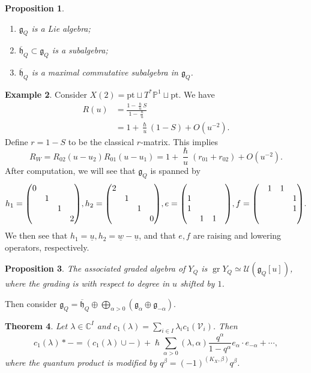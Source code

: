 \documentclass[leqno, openany]{memoir}
\newtheorem{thm}{Theorem}[section]
\newtheorem{prop}[thm]{Proposition}
\theoremstyle{definition}
\newtheorem{exm}[thm]{Example}
\theoremstyle{remark}
\theoremstyle{plain}
\theoremstyle{definition}
\theoremstyle{remark}
\newcommand{\C}{\mathbb{C}}
\renewcommand{\P}{\mathbb{P}}
\newcommand{\mc}[1]{\mathcal{#1}}
\newcommand{\mf}[1]{\mathfrak{#1}}
\newcommand{\mr}[1]{\mathrm{#1}}
\newcommand{\on}[1]{\operatorname{#1}}
\newcommand{\ol}[1]{\overline{#1}}
\newcommand{\ul}[1]{\underline{#1}}
\begin{document}
\begin{prop}\leavevmode
    \begin{enumerate}
        \item $\mf{g}_Q$ is a Lie algebra;
        \item $\ol{\mf{h}}_Q \subset \mf{g}_Q$ is a subalgebra;
        \item $\ol{\mf{h}}_Q$ is a maximal commutative subalgebra in $\mf{g}_Q$.
    \end{enumerate}
\end{prop}

\begin{exm}
    Consider $X(2) = \mr{pt} \sqcup T^* \P^1 \sqcup \mr{pt}$. We have
    \begin{align*}
        R(u) &= \frac{1-\frac{\hslash}{u}S}{1-\frac{\hslash}{u}} \\
        &= 1 + \frac{\hslash}{u}(1-S) + O(u^{-2}).
    \end{align*}
    Define $r = 1-S$ to be the classical $r$-matrix. This implies 
    \[ R_W = R_{02}(u-u_2) R_{01}(u-u_1) = 1 + \frac{\hslash}{u}(r_{01} + r_{02}) + O(u^{-2}). \]
    After computation, we will see that $\mf{g}_Q$ is spanned by
    \[ h_1 = \mqty(\dmat{0,1,1,2}), h_2 = \mqty(\dmat{2,1,1,0}), e = \mqty( \\ 1 \\ 1 \\ & 1 & 1 & ), f = \mqty(& 1 & 1 \\ & & & 1 \\ & & & 1 \\ &). \]
    We then see that $h_1 = \ul{u}, h_2 = \ul{w} - \ul{u}$, and that $e, f$ are raising and lowering operators, respectively.
\end{exm}

\begin{prop}
    The associated graded algebra of $Y_Q$ is $\on{gr} Y_Q \simeq \mc{U}(\mf{g}_Q[u])$, where the grading is with respect to degree in $u$ shifted by $1$.
\end{prop}

Then consider $\mf{g}_Q = \ol{\mf{h}}_Q \oplus \bigoplus_{\alpha > 0} (\mf{g}_{\alpha} \oplus \mf{g}_{-\alpha})$.

\begin{thm}
    Let $\lambda \in \C^I$ and $c_1(\lambda) = \sum_{i \in I} \lambda_i c_1(\mc{V}_i)$. Then
    \[ c_1(\lambda) * - = (c_1(\lambda) \cup -) + \hslash \sum_{\alpha > 0} (\lambda, \alpha) \frac{q^{\alpha}}{1-q^{\alpha}} e_{\alpha} \cdot e_{-\alpha} + \cdots, \]
    where the quantum product is modified by $q^{\beta} = (-1)^{(K_X, \beta)} q^{\beta}$.
\end{thm}
\end{document}
